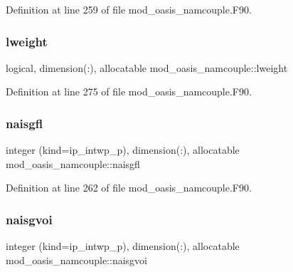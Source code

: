 Definition at line 259 of file mod\+\_\+oasis\+\_\+namcouple.\+F90.

\mbox{\label{namespacemod__oasis__namcouple_a8d88d0c1b22ea43a9429f9e3a653a64b}} 
\subsubsection{\texorpdfstring{lweight}{lweight}}
{\footnotesize\ttfamily logical, dimension(\+:), allocatable mod\+\_\+oasis\+\_\+namcouple\+::lweight\hspace{0.3cm}{\ttfamily [private]}}



Definition at line 275 of file mod\+\_\+oasis\+\_\+namcouple.\+F90.

\mbox{\label{namespacemod__oasis__namcouple_ada0ad7614eba9cc3a1e168484a520c33}} 
\subsubsection{\texorpdfstring{naisgfl}{naisgfl}}
{\footnotesize\ttfamily integer (kind=ip\+\_\+intwp\+\_\+p), dimension(\+:), allocatable mod\+\_\+oasis\+\_\+namcouple\+::naisgfl\hspace{0.3cm}{\ttfamily [private]}}



Definition at line 262 of file mod\+\_\+oasis\+\_\+namcouple.\+F90.

\mbox{\label{namespacemod__oasis__namcouple_a87c0bb7c0a2cccbb673dcaf35e3dec50}} 
\subsubsection{\texorpdfstring{naisgvoi}{naisgvoi}}
{\footnotesize\ttfamily integer (kind=ip\+\_\+intwp\+\_\+p), dimension(\+:), allocatable mod\+\_\+oasis\+\_\+namcouple\+::naisgvoi\hspace{0.3cm}{\ttfamily [private]}}



